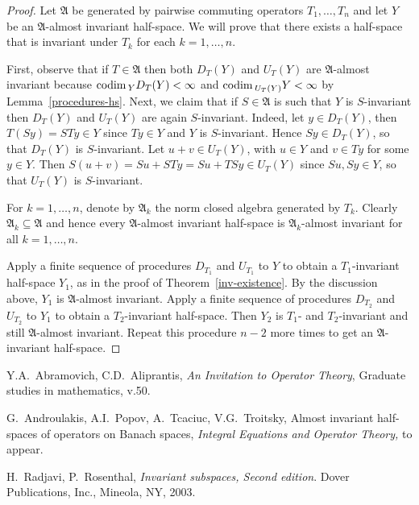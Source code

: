 \documentclass[12pt]{amsart}
\theoremstyle{plain}
\theoremstyle{definition}
\theoremstyle{remark}
\begin{document}
\begin{proof}
Let $\mathfrak A$ be generated by pairwise commuting operators $T_1,\dots,T_n$ and let $Y$ be an $\mathfrak A$-almost invariant half-space. We will prove that there exists a half-space that is invariant under $T_k$ for each $k=1,\dots, n$.

First, observe that if $T\in\mathfrak A$ then both $D_T(Y)$ and $U_T(Y)$ are $\mathfrak A$-almost invariant because ${{\rm codim}\,}_YD_T(Y)<\infty$ and ${{\rm codim}\,}_{U_T(Y)}Y<\infty$ by Lemma~\ref{procedures-hs}. Next, we claim that if $S\in\mathfrak A$ is such that $Y$ is $S$-invariant then $D_T(Y)$ and $U_T(Y)$ are again $S$-invariant. Indeed, let $y\in D_T(Y)$, then $T(Sy)=STy\in Y$ since $Ty\in Y$ and $Y$ is $S$-invariant. Hence $Sy\in D_T(Y)$, so that $D_T(Y)$ is $S$-invariant. Let $u+v\in U_T(Y)$, with $u\in Y$ and $v\in Ty$ for some $y\in Y$. Then $S(u+v)=Su+STy=Su+TSy\in U_T(Y)$ since $Su, Sy\in Y$, so that $U_T(Y)$ is $S$-invariant.

For $k=1,\dots,n$, denote by $\mathfrak A_k$ the norm closed algebra generated by $T_k$. Clearly $\mathfrak A_k\subseteq\mathfrak A$ and hence every $\mathfrak A$-almost invariant half-space is $\mathfrak A_k$-almost invariant for all $k=1,\dots,n$.

Apply a finite sequence of procedures $D_{T_1}$ and $U_{T_1}$ to $Y$ to obtain a $T_1$-invariant half-space $Y_1$, as in the proof of Theorem~\ref{inv-existence}. By the discussion above, $Y_1$ is $\mathfrak A$-almost invariant. Apply a finite sequence of procedures $D_{T_2}$ and $U_{T_2}$ to $Y_1$ to obtain a $T_2$-invariant half-space. Then $Y_2$ is $T_1$- and $T_2$-invariant and still $\mathfrak A$-almost invariant. Repeat this procedure $n-2$ more times to get an $\mathfrak A$-invariant half-space.
\end{proof}

\begin{thebibliography}{00}

  Y.A.~Abramovich, C.D.~Aliprantis,
  \newblock \emph{An Invitation to Operator Theory},
  \newblock Graduate studies in mathematics, v.50.

  G.~Androulakis, A.I.~Popov, A.~Tcaciuc, V.G.~Troitsky, 
  \newblock Almost invariant half-spaces of operators on Banach spaces,
  \newblock \emph{Integral Equations and Operator Theory,} to appear.

  H.~Radjavi, P.~Rosenthal,
  \newblock \emph{Invariant subspaces, Second edition}.
  \newblock Dover Publications, Inc., Mineola, NY, 2003.

\end{thebibliography}
\end{document}
